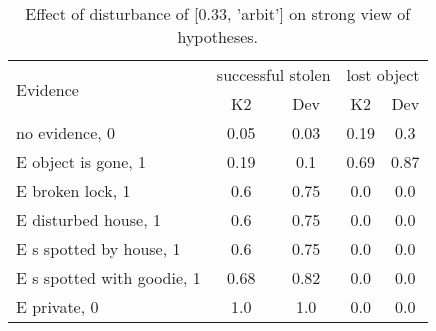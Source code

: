 \begin{table}\begin{tabular}{l|cc|cc}\toprule\multirow{2}{*}{Evidence} & \multicolumn{2}{c}{successful stolen}& \multicolumn{2}{c}{lost object}\\& {K2} & {Dev}& {K2} & {Dev}\\\midrule
no evidence, 0 & 0.05&0.03&\cellcolor{Bittersweet}0.19&\cellcolor{Bittersweet}0.3\\E object is gone, 1 & \cellcolor{Bittersweet}0.19&\cellcolor{Bittersweet}0.1&\cellcolor{Bittersweet}0.69&\cellcolor{Bittersweet}0.87\\E broken lock, 1 & \cellcolor{Bittersweet}0.6&\cellcolor{Bittersweet}0.75&0.0&0.0\\E disturbed house, 1 & \cellcolor{Bittersweet}0.6&\cellcolor{Bittersweet}0.75&0.0&0.0\\E s spotted by house, 1 & \cellcolor{Bittersweet}0.6&\cellcolor{Bittersweet}0.75&0.0&0.0\\E s spotted with goodie, 1 & \cellcolor{Bittersweet}0.68&\cellcolor{Bittersweet}0.82&0.0&0.0\\E private, 0 & 1.0&1.0&0.0&0.0\\\bottomrule\end{tabular}\caption{Effect of disturbance of [0.33, 'arbit'] on strong view of hypotheses.}\end{table}